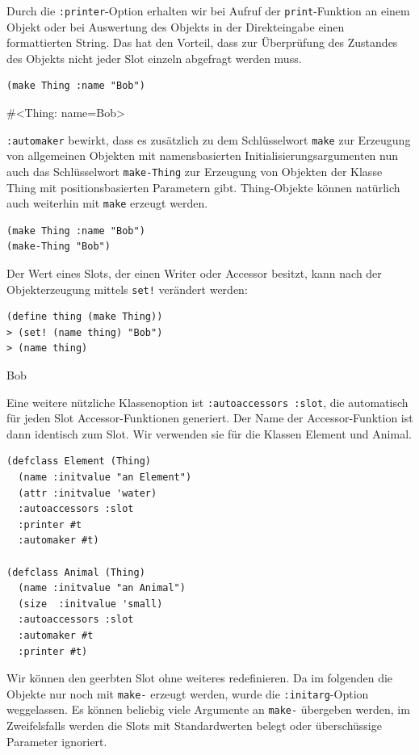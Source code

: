 Durch die \texttt{:printer}-Option erhalten wir bei Aufruf der \texttt{print}-Funktion an einem Objekt oder bei Auswertung des Objekts in der Direkteingabe einen formattierten String. Das hat den Vorteil, dass zur Überprüfung des Zustandes des Objekts nicht jeder Slot einzeln abgefragt werden muss.

\begin{lstlisting}
(make Thing :name "Bob")
\end{lstlisting}
{\routput \#<Thing: name={\qq}Bob\qq>}

\texttt{:automaker} bewirkt, dass es zusätzlich zu dem Schlüsselwort \texttt{make} zur Erzeugung von allgemeinen Objekten mit namensbasierten Initialisierungsargumenten nun auch das Schlüsselwort \texttt{make-Thing} zur Erzeugung von Objekten der Klasse Thing mit positionsbasierten Parametern gibt. Thing-Objekte können natürlich auch weiterhin mit \texttt{make} erzeugt werden.

\begin{lstlisting}
(make Thing :name "Bob")
(make-Thing "Bob")
\end{lstlisting}

Der Wert eines Slots, der einen Writer oder Accessor besitzt, kann nach der Objekterzeugung mittels \texttt{set!} verändert werden:

\begin{lstlisting}
(define thing (make Thing))
> (set! (name thing) "Bob")
> (name thing)
\end{lstlisting}
{\routput {\qq}Bob\qq}

Eine weitere nützliche Klassenoption ist \texttt{:autoaccessors :slot}, die automatisch für jeden Slot Accessor-Funktionen generiert. Der Name der Accessor-Funktion ist dann identisch zum Slot. Wir verwenden sie für die Klassen Element und Animal.

\begin{lstlisting}
(defclass Element (Thing)
  (name :initvalue "an Element") 
  (attr :initvalue 'water)
  :autoaccessors :slot 
  :printer #t          
  :automaker #t)
  
(defclass Animal (Thing)
  (name :initvalue "an Animal")      
  (size  :initvalue 'small)
  :autoaccessors :slot
  :automaker #t
  :printer #t)
\end{lstlisting}

Wir können den geerbten Slot ohne weiteres redefinieren. Da im folgenden die Objekte nur noch mit \texttt{make-} erzeugt werden, wurde die \texttt{:initarg}-Option weggelassen. Es können beliebig viele Argumente an \texttt{make-} übergeben werden, im Zweifelsfalls werden die Slots mit Standardwerten belegt oder überschüssige Parameter ignoriert.


